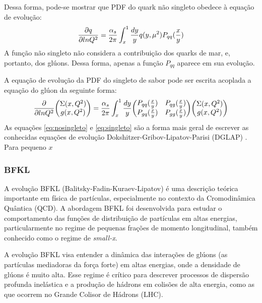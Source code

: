 Dessa forma, pode-se mostrar que PDF do quark não singleto obedece à equação de evolução:
\begin{equation}
    \pdv{q}{lnQ^2} = \frac{\alpha_s}{2\pi} \int^1_x \frac{dy}{y} q(y,\mu^2) P_{qq}(\frac{x}{y})
    \label{eq:nosingleto}
\end{equation}
A função não singleto não considera a contribuição dos quarks de mar, e, portanto, dos glúons. Dessa forma, apenas a função $P_{qq}$ aparece em sua evolução.

A equação de evolução da PDF do singleto de sabor pode ser escrita acoplada a equação do glúon da seguinte forma:
\begin{equation}
    \pdv{lnQ^2}\qty(\begin{matrix} \Sigma(x,Q^2) \\g(x,Q^2)\end{matrix}) = \frac{\alpha_s}{2\pi} \int^1_x \frac{dy}{y} \qty(\begin{matrix}
            P_{qq}(\frac{x}{y} ) & P_{qg}(\frac{x}{y}) \\ P_{gq}(\frac{x}{y}) & P_{gg}(\frac{x}{y})
        \end{matrix})\qty(\begin{matrix} \Sigma(x,Q^2) \\g(x,Q^2)\end{matrix})
    \label{eq:singleto}
\end{equation}
As equações  \eqref{eq:nosingleto} e \eqref{eq:singleto} são a forma mais geral de escrever as conhecidas  equações de evolução  Dokshitzer-Gribov-Lipatov-Parisi (DGLAP) . Para pequeno $x$
\subsubsection{BFKL}

A evolução BFKL (Balitsky-Fadin-Kuraev-Lipatov) é uma descrição teórica importante em física de partículas, especialmente no contexto da Cromodinâmica Quântica (QCD). A abordagem BFKL foi desenvolvida para estudar o comportamento das funções de distribuição de partículas em altas energias, particularmente no regime de pequenas frações de momento longitudinal, também conhecido como o regime de \textit{small-x}.

A evolução BFKL visa entender a dinâmica das interações de glúons (as partículas mediadoras da força forte) em altas energias, onde a densidade de glúons é muito alta. Esse regime é crítico para descrever processos de dispersão profunda inelástica e a produção de hádrons em colisões de alta energia, como as que ocorrem no Grande Colisor de Hádrons (LHC).

